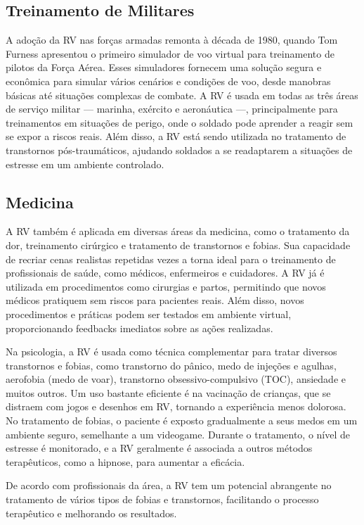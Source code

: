 \documentclass[article,a4paper,12pt,brazil,sumario=tradicional]{abntex2}
\begin{document}
\subsection{Treinamento de Militares}
A adoção da RV nas forças armadas remonta à década de 1980, quando Tom Furness apresentou o primeiro simulador de voo virtual para treinamento de pilotos da Força Aérea. Esses simuladores fornecem uma solução segura e econômica para simular vários cenários e condições de voo, desde manobras básicas até situações complexas de combate. A RV é usada em todas as três áreas de serviço militar — marinha, exército e aeronáutica —, principalmente para treinamentos em situações de perigo, onde o soldado pode aprender a reagir sem se expor a riscos reais. Além disso, a RV está sendo utilizada no tratamento de transtornos pós-traumáticos, ajudando soldados a se readaptarem a situações de estresse em um ambiente controlado.

\subsection{Medicina}
A RV também é aplicada em diversas áreas da medicina, como o tratamento da dor, treinamento cirúrgico e tratamento de transtornos e fobias. Sua capacidade de recriar cenas realistas repetidas vezes a torna ideal para o treinamento de profissionais de saúde, como médicos, enfermeiros e cuidadores. A RV já é utilizada em procedimentos como cirurgias e partos, permitindo que novos médicos pratiquem sem riscos para pacientes reais. Além disso, novos procedimentos e práticas podem ser testados em ambiente virtual, proporcionando feedbacks imediatos sobre as ações realizadas.

Na psicologia, a RV é usada como técnica complementar para tratar diversos transtornos e fobias, como transtorno do pânico, medo de injeções e agulhas, aerofobia (medo de voar), transtorno obsessivo-compulsivo (TOC), ansiedade e muitos outros. Um uso bastante eficiente é na vacinação de crianças, que se distraem com jogos e desenhos em RV, tornando a experiência menos dolorosa. No tratamento de fobias, o paciente é exposto gradualmente a seus medos em um ambiente seguro, semelhante a um videogame. Durante o tratamento, o nível de estresse é monitorado, e a RV geralmente é associada a outros métodos terapêuticos, como a hipnose, para aumentar a eficácia.

De acordo com profissionais da área, a RV tem um potencial abrangente no tratamento de vários tipos de fobias e transtornos, facilitando o processo terapêutico e melhorando os resultados.
\end{document}
